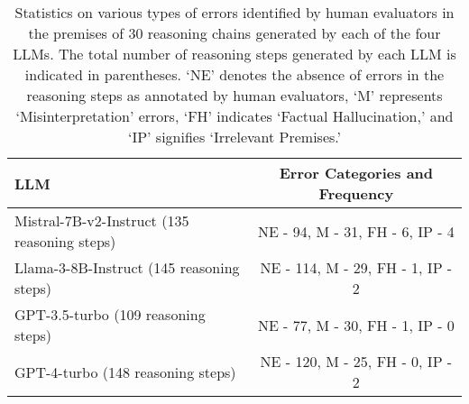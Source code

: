 \begin{table*}[!htbp]
\small
\centering
\begin{tabular}{lc}
\toprule
LLM   & Error Categories and Frequency\\ 
\midrule
Mistral-7B-v2-Instruct (135 reasoning steps)   & NE - 94, M - 31, FH - 6, IP - 4\\  
Llama-3-8B-Instruct (145 reasoning steps)   & NE - 114, M - 29, FH - 1, IP - 2\\
GPT-3.5-turbo (109 reasoning steps)   & 	NE - 77, M - 30, FH - 1, IP - 0\\
GPT-4-turbo (148 reasoning steps)    & NE - 120, M - 25, FH - 0, IP - 2\\ 
\bottomrule
\end{tabular}
\caption{Statistics on various types of errors identified by human evaluators in the premises of 30 reasoning chains generated by each of the four LLMs. The total number of reasoning steps generated by each LLM is indicated in parentheses. `NE' denotes the absence of errors in the reasoning steps as annotated by human evaluators, `M' represents `Misinterpretation' errors, `FH' indicates `Factual Hallucination,' and `IP' signifies `Irrelevant Premises.'}
\label{table:manual-evaluation-premise}
\end{table*}